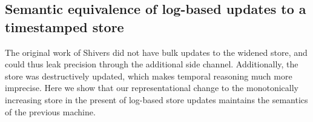 \documentclass{llncs}
\begin{document}
\subsection{Semantic equivalence of log-based updates to a timestamped store}
The original work of Shivers did not have bulk updates to the widened
store, and could thus leak precision through the additional side
channel. Additionally, the store was destructively updated, which
makes temporal reasoning much more imprecise. Here we show that our
representational change to the monotonically increasing store in the
present of log-based store updates maintains the semantics of the previous machine.
\end{document}
